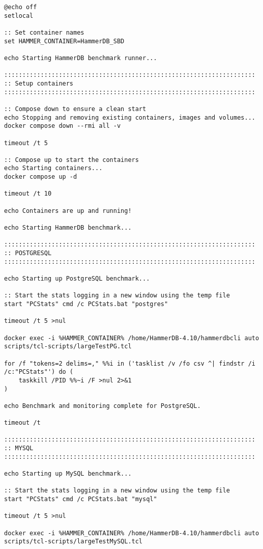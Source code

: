 \begin{lstlisting}[caption={Batch script to run the TCL scripts}, label={lst:batch-script}]
@echo off
setlocal

:: Set container names
set HAMMER_CONTAINER=HammerDB_SBD

echo Starting HammerDB benchmark runner...

:::::::::::::::::::::::::::::::::::::::::::::::::::::::::::::::::::::
:: Setup containers
:::::::::::::::::::::::::::::::::::::::::::::::::::::::::::::::::::::

:: Compose down to ensure a clean start
echo Stopping and removing existing containers, images and volumes...
docker compose down --rmi all -v

timeout /t 5

:: Compose up to start the containers
echo Starting containers...
docker compose up -d

timeout /t 10

echo Containers are up and running!

echo Starting HammerDB benchmark...

:::::::::::::::::::::::::::::::::::::::::::::::::::::::::::::::::::::
:: POSTGRESQL
:::::::::::::::::::::::::::::::::::::::::::::::::::::::::::::::::::::

echo Starting up PostgreSQL benchmark...

:: Start the stats logging in a new window using the temp file
start "PCStats" cmd /c PCStats.bat "postgres"

timeout /t 5 >nul

docker exec -i %HAMMER_CONTAINER% /home/HammerDB-4.10/hammerdbcli auto scripts/tcl-scripts/largeTestPG.tcl

for /f "tokens=2 delims=," %%i in ('tasklist /v /fo csv ^| findstr /i /c:"PCStats"') do (
    taskkill /PID %%~i /F >nul 2>&1
)

echo Benchmark and monitoring complete for PostgreSQL.

timeout /t 

:::::::::::::::::::::::::::::::::::::::::::::::::::::::::::::::::::::
:: MYSQL
:::::::::::::::::::::::::::::::::::::::::::::::::::::::::::::::::::::

echo Starting up MySQL benchmark...

:: Start the stats logging in a new window using the temp file
start "PCStats" cmd /c PCStats.bat "mysql"

timeout /t 5 >nul

docker exec -i %HAMMER_CONTAINER% /home/HammerDB-4.10/hammerdbcli auto scripts/tcl-scripts/largeTestMySQL.tcl


\end{lstlisting}
